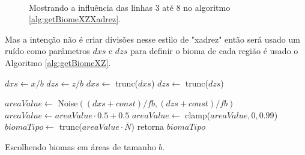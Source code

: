  
\begin{figure}[H]
     \centering
     \hspace{0.1cm}
     \\
     
     \caption{Mostrando a influência das linhas 3 até 8 no algoritmo \ref{alg:getBiomeXZXadrez}.}
     
     \label{fig:ssxadrez}
\end{figure}

Mas a intenção não é criar divisões nesse estilo de "xadrez" então será usado um 
ruído como parâmetros $dxs$ e $dzs$ para definir o bioma de cada região é usado
o Algoritmo \ref{alg:getBiomeXZ}.

\begin{algorithm}[H]\label{alg:getBiomeXZ}
    $dxs \leftarrow x/b$\;
    $dzs \leftarrow z/b$\;
    $dxs \leftarrow$ trunc($dxs$)\;
    $dzs \leftarrow$ trunc($dzs$)\;
    
    $areaValue \leftarrow$ Noise$((dxs + const)/fb, (dzs + const)/fb)$\;
    $areaValue \leftarrow  areaValue \cdot 0.5 + 0.5$\;
    $areaValue \leftarrow$ clamp($areaValue, 0, 0.99$)\;
    $biomaTipo \leftarrow$ trunc($areaValue \cdot \bar{N}$)\;
    retorna $biomaTipo$\;
    \caption{Escolhendo biomas em áreas de tamanho $b$.}
\end{algorithm}

